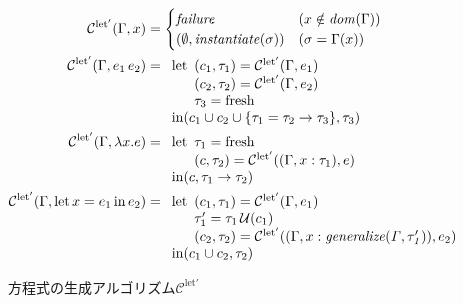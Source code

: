 \begin{figure}[htbp]
  \begin{align*}
    \mathcal C^\mathrm{let'}(\Gamma, x) &=
    \begin{cases}
      \mathit{failure}                          & (x \notin \mathit{dom}(\Gamma)) \\
      (\emptyset, \mathit{instantiate}(\sigma)) & (\sigma = \Gamma(x))
    \end{cases} \\
    \mathcal C^\mathrm{let'}(\Gamma, e_1 \, e_2) &=
    \begin{array}[t]{l}
      \mathrm{let}
        \begin{array}[t]{l}
          (c_1, \tau_1) = \mathcal C^\mathrm{let'}(\Gamma, e_1) \\
          (c_2, \tau_2) = \mathcal C^\mathrm{let'}(\Gamma, e_2) \\
          \tau_3 = \mathrm{fresh}
        \end{array} \\
      \mathrm{in} (c_1 \cup c_2 \cup \{\tau_1 = \tau_2 \to \tau_3\}, \tau_3)
    \end{array} \\
    \mathcal C^\mathrm{let'}(\Gamma, \lambda x . e) &=
    \begin{array}[t]{l}
      \mathrm{let}
        \begin{array}[t]{l}
          \tau_1 = \mathrm{fresh} \\
          (c, \tau_2) = \mathcal C^\mathrm{let'}((\Gamma, x : \tau_1), e)
        \end{array} \\
      \mathrm{in} (c, \tau_1 \to \tau_2)
    \end{array} \\
    \mathcal C^\mathrm{let'}(\Gamma, \mathrm{let} \, x = e_1 \, \mathrm{in} \, e_2) &=
    \begin{array}[t]{l}
      \mathrm{let}
        \begin{array}[t]{l}
          (c_1, \tau_1) = \mathcal C^\mathrm{let'}(\Gamma, e_1) \\
          \tau_1'       = \tau_1 \, \mathcal U(c_1) \\
          (c_2, \tau_2) = \mathcal C^\mathrm{let'}((\Gamma, x : \mathit{generalize(\Gamma, \tau_1')}) , e_2)
        \end{array} \\
      \mathrm{in} (c_1 \cup c_2, \tau_2)
    \end{array}
  \end{align*}
  \caption{方程式の生成アルゴリズム$\mathcal C^\mathrm{let'}$}
  \label{fig:algorithm-c-let2}
\end{figure}

